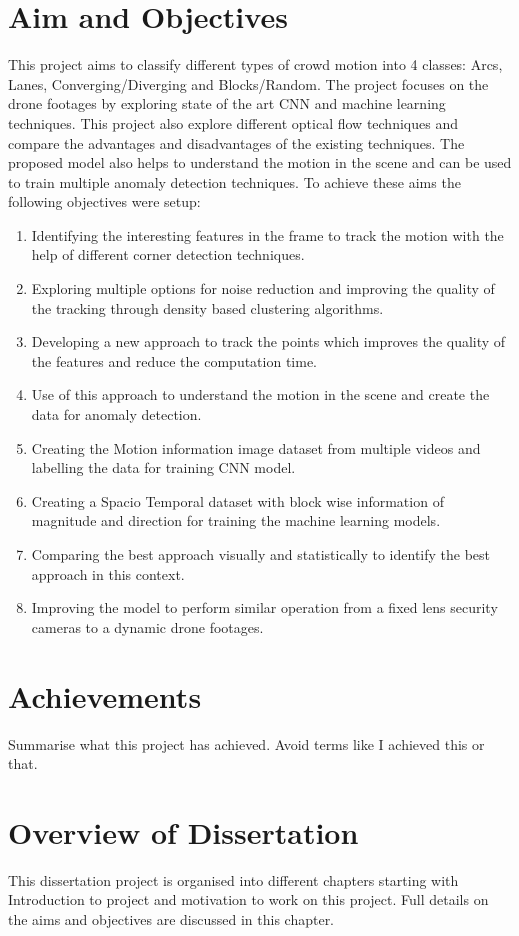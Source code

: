 \section{Aim and Objectives} \label{sec:objectives}
This project aims to classify different types of crowd motion into 4 classes: Arcs, Lanes, Converging/Diverging and Blocks/Random. The project focuses on the drone footages by exploring state of the art CNN and machine learning techniques. 
This project also explore different optical flow techniques and compare the advantages and disadvantages of the existing techniques. The proposed model also helps to understand the motion in the scene and can be used to train multiple anomaly detection techniques. To achieve these aims the following objectives were setup:
\begin{enumerate}
	\item Identifying the interesting features in the frame to track the motion with the help of different corner detection techniques.
	\item Exploring multiple options for noise reduction and improving the quality of the tracking through density based clustering algorithms.
	\item Developing a new approach to track the points which improves the quality of the features and reduce the computation time.
	\item Use of this approach to understand the motion in the scene and create the data for anomaly detection.
	\item Creating the Motion information image dataset from multiple videos and labelling the data for training CNN model.
	\item Creating a Spacio Temporal dataset with block wise information of magnitude and direction for training the machine learning models.
	\item Comparing the best approach visually and statistically to identify the best approach in this context.
	\item Improving the model to perform similar operation from a fixed lens security cameras to a dynamic drone footages.
\end{enumerate}

\section{Achievements}
Summarise what this project has achieved. Avoid terms like I achieved this or 
that. 

\section{Overview of Dissertation}
This dissertation project is organised into different chapters starting with Introduction to project and motivation to work on this project. Full details on the aims and objectives are discussed in this chapter.

